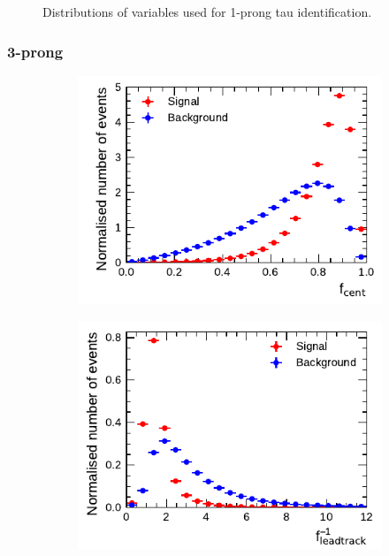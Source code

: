 \begin{figure}[htbp]
\begin{subfigure}{0.5\textwidth}
  \end{subfigure}
  \caption[]{Distributions of variables used for 1-prong tau identification.}
\end{figure}

\clearpage
\subsubsection{3-prong}

\begin{figure}[htbp]
  \begin{subfigure}{0.5\textwidth}
    \centering
    \includegraphics{./figures/baseline_bdt_vars/3p/centFrac.pdf}
  \end{subfigure}%
  \begin{subfigure}{0.5\textwidth}
    \centering
    \includegraphics{./figures/baseline_bdt_vars/3p/etOverPtLeadTrk.pdf}
  \end{subfigure}

\end{figure}

